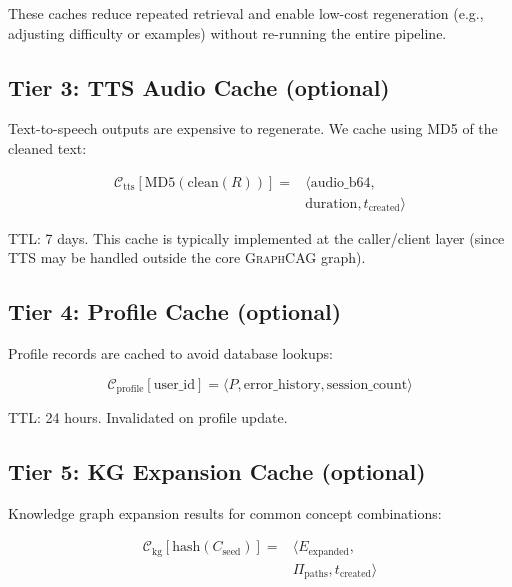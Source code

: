 \documentclass[11pt,a4paper,twocolumn]{article}
\newcommand{\graphcag}{\textsc{GraphCAG}}
\begin{document}
These caches reduce repeated retrieval and enable low-cost regeneration (e.g., adjusting difficulty or examples) without re-running the entire pipeline.

\subsection{Tier 3: TTS Audio Cache (optional)}

Text-to-speech outputs are expensive to regenerate. We cache using MD5 of the cleaned text:

\begin{equation}
\begin{aligned}
\mathcal{C}_\text{tts}[\text{MD5}(\text{clean}(R))] ={}& \langle \text{audio\_b64}, \\
& \text{duration}, t_\text{created} \rangle
\end{aligned}
\end{equation}

\noindent TTL: 7 days. This cache is typically implemented at the caller/client layer (since TTS may be handled outside the core \graphcag{} graph).

\subsection{Tier 4: Profile Cache (optional)}

Profile records are cached to avoid database lookups:

\begin{equation}
\mathcal{C}_\text{profile}[\text{user\_id}] = \langle P, \text{error\_history}, \text{session\_count} \rangle
\end{equation}

\noindent TTL: 24 hours. Invalidated on profile update.

\subsection{Tier 5: KG Expansion Cache (optional)}

Knowledge graph expansion results for common concept combinations:

\begin{equation}
\begin{aligned}
\mathcal{C}_\text{kg}[\text{hash}(C_\text{seed})] ={}& \langle E_\text{expanded}, \\
& \Pi_\text{paths}, t_\text{created} \rangle
\end{aligned}
\end{equation}
\end{document}
